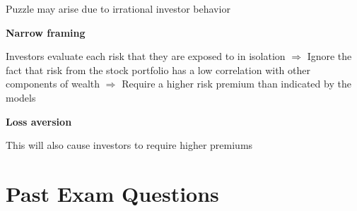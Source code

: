 \documentclass[]{book}
\theoremstyle{definition}
\theoremstyle{definition}
\theoremstyle{remark}
\begin{document}
Puzzle may arise due to irrational investor behavior

\textbf{Narrow framing}

Investors evaluate each risk that they are exposed to in isolation
\(\Rightarrow\) Ignore the fact that risk from the stock portfolio has a
low correlation with other components of wealth \(\Rightarrow\) Require
a higher risk premium than indicated by the models

\textbf{Loss aversion}

This will also cause investors to require higher premiums

\section{Past Exam Questions}\label{past-exam-questions-7}
\end{document}
